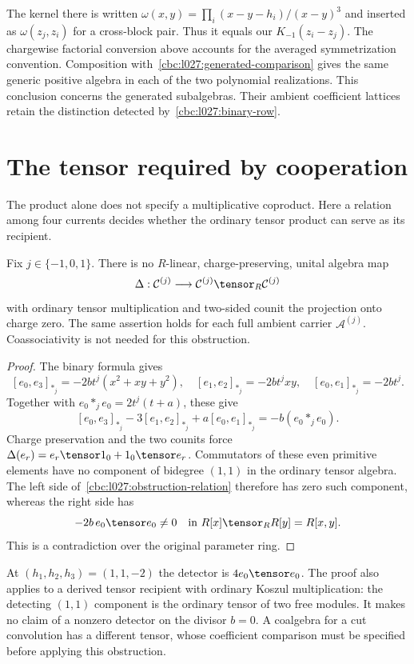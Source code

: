 The kernel there is written
$\omega(x,y)=\prod_i(x-y-h_i)/(x-y)^3$ and inserted as
$\omega(z_j,z_i)$ for a cross-block pair.  Thus it equals our
$K_{-1}(z_i-z_j)$.  The chargewise factorial conversion above
accounts for the averaged symmetrization convention.
Composition with~\eqref{cbc:l027:generated-comparison} gives the
same generic positive algebra in each of the two polynomial
realizations.  This conclusion concerns the generated subalgebras.
Their ambient coefficient lattices retain the distinction detected
by~\eqref{cbc:l027:binary-row}.

\section{The tensor required by cooperation}
The product alone does not specify a multiplicative coproduct.
Here a relation among four currents decides whether the ordinary
tensor product can serve as its recipient.

\begin{theorem}
Fix $j\in\{-1,0,1\}$.  There is no $R$-linear,
charge-preserving, unital algebra map
\[
 \Delta:\mathcal C^{(j)}\longrightarrow
 \mathcal C^{(j)}\tensor_R\mathcal C^{(j)}
\]
with ordinary tensor multiplication and two-sided counit the
projection onto charge zero.  The same assertion holds for each
full ambient carrier $\mathcal A^{(j)}$.  Coassociativity is not
needed for this obstruction.
\end{theorem}
\begin{proof}
The binary formula gives
\[
 [e_0,e_3]_{*_j}=-2bt^j(x^2+xy+y^2),\quad
 [e_1,e_2]_{*_j}=-2bt^jxy,\quad
 [e_0,e_1]_{*_j}=-2bt^j.
\]
Together with $e_0*_je_0=2t^j(t+a)$, these give
\begin{equation}\label{cbc:l027:obstruction-relation}
 [e_0,e_3]_{*_j}-3[e_1,e_2]_{*_j}+a[e_0,e_1]_{*_j}
 =-b(e_0*_je_0).
\end{equation}
Charge preservation and the two counits force
$\Delta(e_r)=e_r\tensor1_0+1_0\tensor e_r$.
Commutators of these even primitive elements have no component
of bidegree $(1,1)$ in the ordinary tensor algebra.
The left side of~\eqref{cbc:l027:obstruction-relation} therefore
has zero such component, whereas the right side has
\[
 -2b\,e_0\tensor e_0\ne0
 \quad\text{in }R[x]\tensor_RR[y]=R[x,y].
\]
This is a contradiction over the original parameter ring.
\end{proof}

At $(h_1,h_2,h_3)=(1,1,-2)$ the detector is $4e_0\tensor e_0$.
The proof also applies to a derived tensor recipient with ordinary
Koszul multiplication: the detecting $(1,1)$ component is the
ordinary tensor of two free modules.  It makes no claim of a
nonzero detector on the divisor $b=0$.
A coalgebra for a cut convolution has a different tensor, whose
coefficient comparison must be specified before applying this
obstruction.

